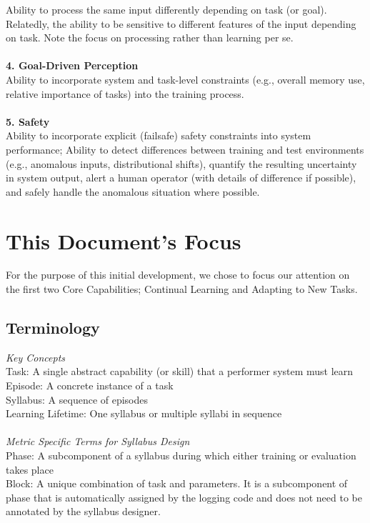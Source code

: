 Ability to process the same input differently depending on task (or goal). Relatedly, the ability to be sensitive to different features of the input depending on task. Note the focus on processing rather than learning per se.\\
\\
\textbf{4. Goal-Driven Perception}\\

Ability to incorporate system and task-level constraints (e.g., overall memory use, relative importance of tasks) into the training process.\\
\\
\textbf{5. Safety}\\

Ability to incorporate explicit (failsafe) safety constraints into system performance; Ability to detect differences between training and test environments (e.g., anomalous inputs, distributional shifts), quantify the resulting uncertainty in system output, alert a human operator (with details of difference if possible), and safely handle the anomalous situation where possible.


\section{This Document's Focus}

For the purpose of this initial development, we chose to focus our attention on the first two Core Capabilities; Continual Learning and Adapting to New Tasks. 

\subsection*{Terminology}



\textit{Key Concepts}
\\
Task: A single abstract capability (or skill) that a performer system must learn\\
Episode: A concrete instance of a task\\
Syllabus: A sequence of episodes\\
Learning Lifetime: One syllabus or multiple syllabi in sequence\\
\\
\textit{Metric Specific Terms for Syllabus Design}\\
Phase: A subcomponent of a syllabus during which either training or evaluation takes place\\
Block: A unique combination of task and parameters. It is a subcomponent of phase that is automatically assigned by the logging code and does not need to be annotated by the syllabus designer.\\

